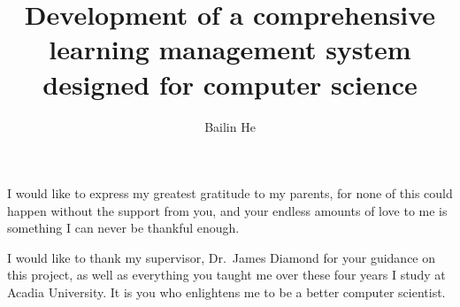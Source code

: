 

\title{Development of a comprehensive learning management system designed for
computer science}

\author{Bailin He}







\firstThreePages


\Acknowledgments
I would like to express my greatest gratitude to my parents,
for none of this could happen without the
support from you, and your endless amounts of love to me is something
I can never be thankful enough.

\medskip

I would like to thank my supervisor, Dr.~James Diamond for your
guidance on this project, as well as everything you taught me over these four
years I study at Acadia University.
It is you who enlightens me to be a better computer scientist.

